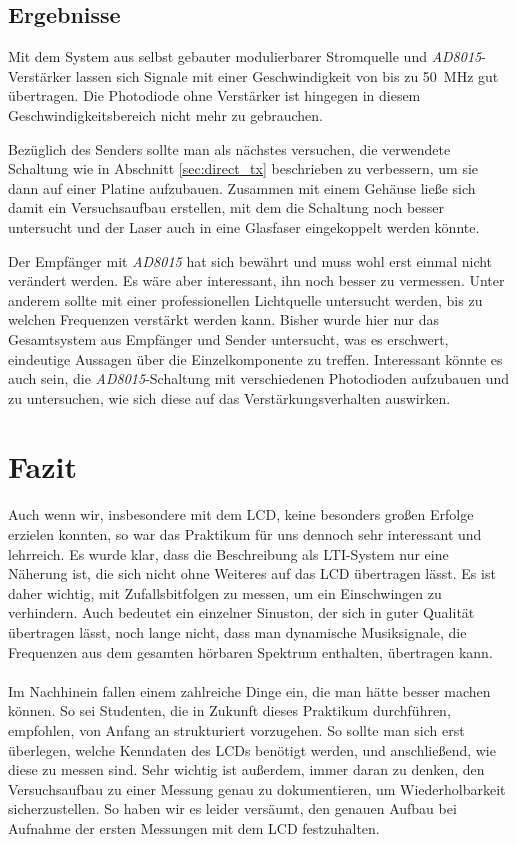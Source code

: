 \documentclass[12pt,a4paper]{article}
\begin{document}
\subsection{Ergebnisse}
Mit dem System aus selbst gebauter modulierbarer Stromquelle und \textit{AD8015}-Verstärker lassen sich Signale mit einer Geschwindigkeit von bis zu \SI{50}{\mega\hertz} gut übertragen. Die Photodiode ohne Verstärker ist hingegen in diesem Geschwindigkeitsbereich nicht mehr zu gebrauchen.

Bezüglich des Senders sollte man als nächstes versuchen, die verwendete Schaltung wie in Abschnitt \ref{sec:direct_tx} beschrieben zu verbessern, um sie dann auf einer Platine aufzubauen. Zusammen mit einem Gehäuse ließe sich damit ein Versuchsaufbau erstellen, mit dem die Schaltung noch besser untersucht und der Laser auch in eine Glasfaser eingekoppelt werden könnte.

Der Empfänger mit \textit{AD8015} hat sich bewährt und muss wohl erst einmal nicht verändert werden. Es wäre aber interessant, ihn noch besser zu vermessen. Unter anderem sollte mit einer professionellen Lichtquelle untersucht werden, bis zu welchen Frequenzen verstärkt werden kann. Bisher wurde hier nur das Gesamtsystem aus Empfänger und Sender untersucht, was es erschwert, eindeutige Aussagen über die Einzelkomponente zu treffen. Interessant könnte es auch sein, die \textit{AD8015}-Schaltung mit verschiedenen Photodioden aufzubauen und zu untersuchen, wie sich diese auf das Verstärkungsverhalten auswirken.

\section{Fazit}

Auch wenn wir, insbesondere mit dem LCD, keine besonders großen Erfolge erzielen konnten, so war das Praktikum für uns dennoch sehr interessant und lehrreich. Es wurde klar, dass die Beschreibung als LTI-System nur eine Näherung ist, die sich nicht ohne Weiteres auf das LCD übertragen lässt. Es ist daher wichtig, mit Zufallsbitfolgen zu messen, um ein Einschwingen zu verhindern. Auch bedeutet ein einzelner Sinuston, der sich in guter Qualität übertragen lässt, noch lange nicht, dass man dynamische Musiksignale, die Frequenzen aus dem gesamten hörbaren Spektrum enthalten, übertragen kann.
\\\\
Im Nachhinein fallen einem zahlreiche Dinge ein, die man hätte besser machen können. So sei Studenten, die in Zukunft dieses Praktikum durchführen, empfohlen, von Anfang an strukturiert vorzugehen. So sollte man sich erst überlegen, welche Kenndaten des LCDs benötigt werden, und anschließend, wie diese zu messen sind. Sehr wichtig ist außerdem, immer daran zu denken, den Versuchsaufbau zu einer Messung genau zu dokumentieren, um Wiederholbarkeit sicherzustellen. So haben wir es leider versäumt, den genauen Aufbau bei Aufnahme der ersten Messungen mit dem LCD festzuhalten.
\end{document}
